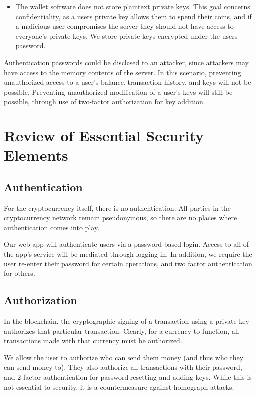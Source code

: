 \documentclass[12pt]{article}
\begin{document}
\begin{itemize}
\item The wallet software does not store plaintext private keys. This goal concerns confidentiality, as a users private key allows them to spend their coins, and if a malicious user compromises the server they should not have access to everyone's private keys. We store private keys encrypted under the users password.
\end{itemize}

Authentication passwords could be disclosed to an attacker, since attackers may have access to the memory contents of the server. In this scenario, preventing unauthorized access to a user's balance, transaction history, and keys will not be possible. Preventing unauthorized modification of a user's keys will still be possible, through use of two-factor authorization for key addition.

\section{Review of Essential Security Elements}

\subsection{Authentication}

For the cryptocurrency itself, there is no authentication. All parties in the cryptocurrency network remain pseudonymous, so there are no places where authentication comes into play.

Our web-app will authenticate users via a password-based login. Access to all of the app's service will be mediated through logging in. In addition, we require the user re-enter their password for certain operations, and two factor authentication for others.

\subsection{Authorization}

In the blockchain, the cryptographic signing of a transaction using a private key authorizes that particular transaction. Clearly, for a currency to function, all transactions made with that currency must be authorized.

We allow the user to authorize who can send them money (and thus who they can send money to). They also authorize all transactions with their password, and 2-factor authentication for password resetting and adding keys.
While this is not essential to security, it is a countermeasure against homograph attacks.
\end{document}
